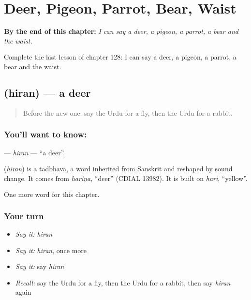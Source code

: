 
\chapter{Deer, Pigeon, Parrot, Bear, Waist}
\label{ch:ur-deer-pigeon-parrot-bear-waist}

\begin{chapteropening}
\textbf{By the end of this chapter:} \emph{I can say a deer, a pigeon, a parrot, a bear and the waist.}

Complete the last lesson of chapter 128: I can say a deer, a pigeon, a parrot, a bear and the waist.
\end{chapteropening}

\section[\texorpdfstring{\ur{ہرن} (hiran)}{ہرن (hiran)}]{ (hiran) — a deer}

\label{lesson:UR-C128-hiran}



\begin{quote}
Before the new one: say the Urdu for a fly, then the Urdu for a rabbit.
\end{quote}

\subsection*{You'll want to know: }
\textbf{} — \emph{hiran} — \textquotedblleft{}a deer\textquotedblright{}.

\begin{cousinweb}
\textbf{} (\emph{hiran}) is a tadbhava, a word inherited from Sanskrit and reshaped by sound change. It comes from \emph{hariṇa}, \textquotedblleft{}deer\textquotedblright{} (CDIAL 13982). It is built on \emph{hari}, \textquotedblleft{}yellow\textquotedblright{}.
\end{cousinweb}

\begin{grammarlens}[title={What you've built}]
One more word for this chapter.
\end{grammarlens}

\subsection*{Your turn}
\begin{itemize}
\raggedright
  \item \emph{Say it:} \emph{hiran}
  \item \emph{Say it:} \emph{hiran}, once more
  \item \emph{Say it:} say \emph{hiran}
  \item \emph{Recall:} say the Urdu for a fly, then the Urdu for a rabbit, then say \emph{hiran} again
\end{itemize}

